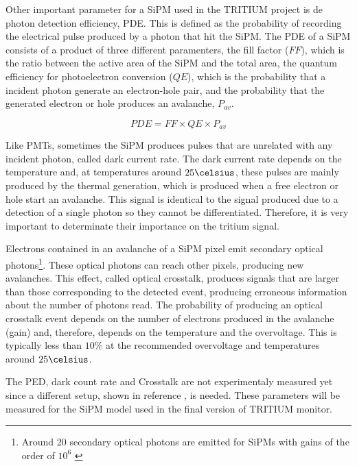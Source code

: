 Other important parameter for a SiPM used in the TRITIUM project is de photon detection efficiency, PDE. This is defined as the probability of recording the electrical pulse produced by a photon that hit the SiPM. The PDE of a SiPM consists of a product of three different paramenters, the fill factor ($FF$), which is the ratio between the active area of the SiPM and the total area, the quantum efficiency for photoelectron conversion ($QE$), which is the probability that a incident photon generate an electron-hole pair, and the probability that the generated electron or hole produces an avalanche, $P_{av}$.

\begin{equation}
PDE=FF \times QE \times P_{av}
\label{PDE_SiPM}
\end{equation}

Like PMTs, sometimes the SiPM produces pulses that are unrelated with any incident photon, called dark current rate. The dark current rate depends on the temperature and, at temperatures around $25\celsius$, these pulses are mainly produced by the thermal generation, which is produced when a free electron or hole start an avalanche. This signal is identical to the signal produced due to a detection of a single photon so they cannot be differentiated. Therefore, it is very important to determinate their importance on the tritium signal.

Electrons contained in an avalanche of a SiPM pixel emit secondary optical photons\footnote{Around 20 secondary optical photons are emitted for SiPMs with gains of the order of $10^6$ \cite{CrosstalkProbability}}. These optical photons can reach other pixels, producing new avalanches. This effect, called optical crosstalk, produces signals that are larger than those corresponding to the detected event, producing erroneous information about the number of photons read. The probability of producing an optical crosstalk event depends on the number of electrons produced in the avalanche (gain) and, therefore, depends on the temperature and the overvoltage. This is typically less than $10\%$ at the recommended overvoltage and temperatures around $25\celsius$.

The PED, dark count rate and Crosstalk are not experimentaly measured yet since a different setup, shown in reference \cite{PDEStudy}, is needed. These parameters will be measured for the SiPM model used in the final version of TRITIUM monitor.

